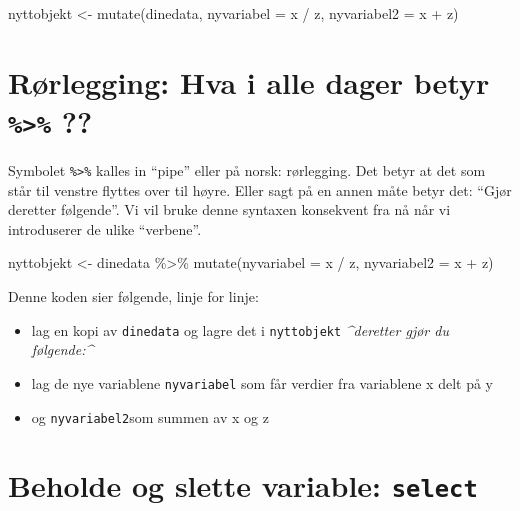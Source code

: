 \documentclass[
  letterpaper,
  DIV=11,
  numbers=noendperiod]{scrreprt}
\newenvironment{Shaded}{\begin{snugshade}}{\end{snugshade}}
\newcommand{\AttributeTok}[1]{\textcolor[rgb]{0.40,0.45,0.13}{#1}}
\newcommand{\FunctionTok}[1]{\textcolor[rgb]{0.28,0.35,0.67}{#1}}
\newcommand{\NormalTok}[1]{\textcolor[rgb]{0.00,0.23,0.31}{#1}}
\newcommand{\OtherTok}[1]{\textcolor[rgb]{0.00,0.23,0.31}{#1}}
\newcommand{\SpecialCharTok}[1]{\textcolor[rgb]{0.37,0.37,0.37}{#1}}
\providecommand{\tightlist}{%
  \setlength{\itemsep}{0pt}\setlength{\parskip}{0pt}}\usepackage{longtable,booktabs,array}
\theoremstyle{definition}
\theoremstyle{remark}
\begin{document}
\begin{Shaded}
\begin{Highlighting}[]
\NormalTok{nyttobjekt }\OtherTok{\textless{}{-}} \FunctionTok{mutate}\NormalTok{(dinedata, }\AttributeTok{nyvariabel =}\NormalTok{ x }\SpecialCharTok{/}\NormalTok{ z,}
                     \AttributeTok{nyvariabel2 =}\NormalTok{ x }\SpecialCharTok{+}\NormalTok{ z)}
\end{Highlighting}
\end{Shaded}

\hypertarget{ruxf8rlegging-hva-i-alle-dager-betyr}{%
\section{\texorpdfstring{Rørlegging: Hva i alle dager betyr
\texttt{\%\textgreater{}\%}
??}{Rørlegging: Hva i alle dager betyr \%\textgreater\% ??}}\label{ruxf8rlegging-hva-i-alle-dager-betyr}}

Symbolet \texttt{\%\textgreater{}\%} kalles in ``pipe'' eller på norsk:
rørlegging. Det betyr at det som står til venstre flyttes over til
høyre. Eller sagt på en annen måte betyr det: ``Gjør deretter
følgende''. Vi vil bruke denne syntaxen konsekvent fra nå når vi
introduserer de ulike ``verbene''.

\begin{Shaded}
\begin{Highlighting}[]
\NormalTok{nyttobjekt }\OtherTok{\textless{}{-}}\NormalTok{ dinedata }\SpecialCharTok{\%\textgreater{}\%} 
  \FunctionTok{mutate}\NormalTok{(}\AttributeTok{nyvariabel =}\NormalTok{ x }\SpecialCharTok{/}\NormalTok{ z,}
         \AttributeTok{nyvariabel2 =}\NormalTok{ x }\SpecialCharTok{+}\NormalTok{ z)}
\end{Highlighting}
\end{Shaded}

Denne koden sier følgende, linje for linje:

\begin{itemize}
\tightlist
\item
  lag en kopi av \texttt{dinedata} og lagre det i \texttt{nyttobjekt}
  \emph{\^{}deretter gjør du følgende:\^{}}
\item
  lag de nye variablene \texttt{nyvariabel} som får verdier fra
  variablene x delt på y
\item
  og \texttt{nyvariabel2}som summen av x og z
\end{itemize}

\hypertarget{beholde-og-slette-variable-select}{%
\section{\texorpdfstring{Beholde og slette variable:
\texttt{select}}{Beholde og slette variable: select}}\label{beholde-og-slette-variable-select}}
\end{document}
